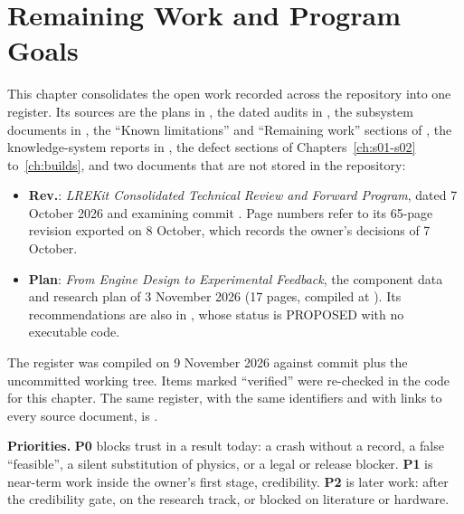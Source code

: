 \chapter{Remaining Work and Program Goals}\label{ch:remaining-work}


This chapter consolidates the open work recorded across the repository into one register. Its sources are the plans in , the dated audits in , the subsystem documents in , the ``Known limitations'' and ``Remaining work'' sections of , the knowledge-system reports in , the defect sections of Chapters~\ref{ch:s01-s02} to~\ref{ch:builds}, and two documents that are not stored in the repository:
\begin{itemize}
  \item \textbf{Rev.}: \emph{LREKit Consolidated Technical Review and Forward Program}, dated 7 October 2026 and examining commit . Page numbers refer to its 65-page revision exported on 8 October, which records the owner's decisions of 7 October.
  \item \textbf{Plan}: \emph{From Engine Design to Experimental Feedback}, the component data and research plan of 3 November 2026 (17 pages, compiled at ). Its recommendations are also in , whose status is PROPOSED with no executable code.
\end{itemize}
The register was compiled on 9 November 2026 against commit  plus the uncommitted working tree. Items marked ``verified'' were re-checked in the code for this chapter. The same register, with the same identifiers and with links to every source document, is .


\textbf{Priorities.} \textbf{P0} blocks trust in a result today: a crash without a record, a false ``feasible'', a silent substitution of physics, or a legal or release blocker. \textbf{P1} is near-term work inside the owner's first stage, credibility. \textbf{P2} is later work: after the credibility gate, on the research track, or blocked on literature or hardware.

